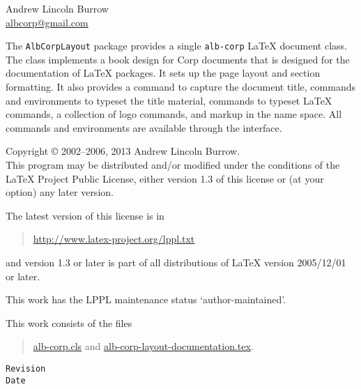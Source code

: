\documentclass[11pt,a4paper,oneside,titlepage]{alb-corp}
\begin{document}



\begin{albTitlePage}


  Andrew Lincoln Burrow\\
  \url{albcorp@gmail.com}



  The \texttt{AlbCorpLayout} package provides a single \texttt{alb-corp}
  \LaTeX{} document class.  The class implements a book design for
  \albLogo{}Corp documents that is designed for the documentation of
  \LaTeX{} packages.  It sets up the page layout and section formatting.
  It also provides a command to capture the document title, commands and
  environments to typeset the title material, commands to typeset
  \LaTeX{} commands, a collection of logo commands, and markup in the
  \albLogo{} name space.  All commands and environments are available
  through the \AUCTeX{} interface.



  Copyright \copyright{} 2002--2006, 2013 Andrew Lincoln Burrow.\\
  This program may be distributed and/or modified under the conditions
  of the \LaTeX{} Project Public License, either version 1.3 of this
  license or (at your option) any later version.

  \medskip{}

  The latest version of this license is in
  \begin{quote}
    \url{http://www.latex-project.org/lppl.txt}
  \end{quote}
  and version 1.3 or later is part of all distributions of LaTeX version
  2005/12/01 or later.

  \medskip{}

  This work has the LPPL maintenance status `author-maintained'.

  \medskip{}

  This work consists of the files
  \begin{quote}
    \begin{flushleft}
      \url{alb-corp.cls} and \url{alb-corp-layout-documentation.tex}.
    \end{flushleft}
  \end{quote}



  \verb$Revision$\\
  \verb$Date$

\end{albTitlePage}
\end{document}

